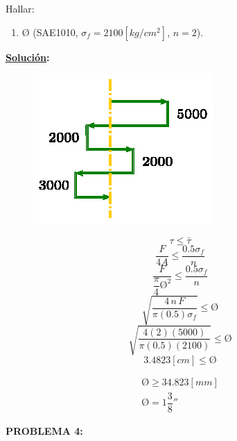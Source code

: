 \documentclass[letter,10pt,twoside]{article}
\begin{document}
Hallar:
\begin{enumerate}
    \item $\text{\O}$ (SAE1010, $\sigma_f=2100[kg/cm^2]$, $n=2$).
\end{enumerate}

\textbf{\underline{Solución}:} \\

\begin{figure}[H]
\centering
\includegraphics[scale=1.3]{resources/g03.eps}
\end{figure}

\begin{equation*}
    \tau \le \bar{\tau}
\end{equation*}
\begin{equation*}
    \frac{F}{4A} \le \frac{0.5 \sigma_f}{n}
\end{equation*}
\begin{equation*}
    \frac{F}{\dfrac{\pi}{4} \text{\O}^2} \le \frac{0.5 \sigma_f}{n}
\end{equation*}
\begin{equation*}
    \sqrt{\frac{4\,n\,F}{\pi(0.5)\sigma_f}} \le \text{\O}
\end{equation*}
\begin{equation*}
    \sqrt{\frac{4(2)(5000)}{\pi(0.5)(2100)}} \le \text{\O}
\end{equation*}
\begin{equation*}
    3.4823[cm] \le \text{\O}
\end{equation*}

\begin{equation*}
\boxed{
    \begin{array}{l}
        \text{\O} \ge 34.823[mm] \\
        \text{\O} = 1\dfrac{3}{8}''
    \end{array}
}
\end{equation*}

\colorbox{blue!25}{\textbf{PROBLEMA 4:}}
\end{document}
